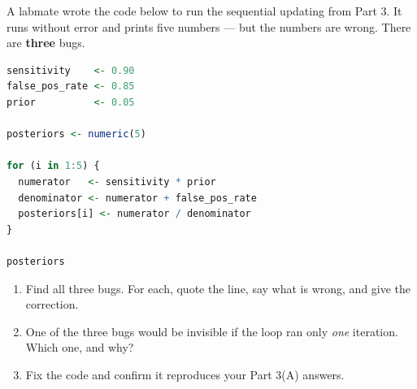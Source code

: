 \documentclass{article}
\begin{document}
A labmate wrote the code below to run the sequential updating from Part 3. It runs without error and prints five numbers --- but the numbers are wrong. There are \textbf{three} bugs.

\begin{lstlisting}[language=R]
sensitivity    <- 0.90
false_pos_rate <- 0.85
prior          <- 0.05

posteriors <- numeric(5)

for (i in 1:5) {
  numerator   <- sensitivity * prior
  denominator <- numerator + false_pos_rate
  posteriors[i] <- numerator / denominator
}

posteriors
\end{lstlisting}

\begin{enumerate}[label={\bfseries (\Alph*)},itemsep=.6em]
	\item Find all three bugs. For each, quote the line, say what is wrong, and give the correction. \\[9em]

	\item One of the three bugs would be invisible if the loop ran only \emph{one} iteration. Which one, and why? \\[4em]

	\item Fix the code and confirm it reproduces your Part 3(A) answers. \\[3em]

\end{enumerate}
\end{document}
